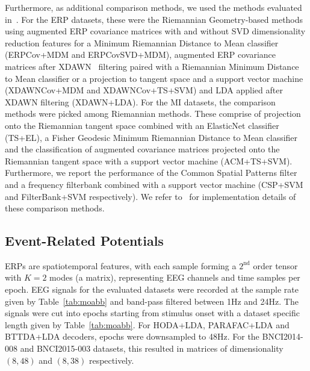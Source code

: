 Furthermore, as additional comparison methods, we used the methods evaluated in~\cite{Chevallier2024}.
For the ERP datasets, these were the Riemannian Geometry-based methods
using augmented ERP covariance matrices with and without SVD dimensionality
reduction features for a Minimum Riemannian Distance to Mean classifier
(ERPCov+MDM and ERPCovSVD+MDM), augmented ERP covariance matrices after
XDAWN~\cite{Rivet2009}
filtering paired with a Riemannian Minimum Distance to Mean classifier or a
projection to tangent space and a support vector machine (XDAWNCov+MDM and
XDAWNCov+TS+SVM) and LDA applied after XDAWN filtering (XDAWN+LDA).
For the MI datasets, the comparison methods were picked among Riemannian
methods.
These comprise of projection onto the Riemannian tangent space combined with an
ElasticNet classifier (TS+EL), a Fisher Geodesic Minimum Riemannian Distance to
Mean classifier and the classification of augmented covariance matrices
projected onto the Riemannian tangent space with a support vector machine
(ACM+TS+SVM).
Furthermore, we report the performance of the Common Spatial Patterns filter
and a frequency filterbank combined with a support vector machine (CSP+SVM and
FilterBank+SVM respectively).
We refer to~\cite{Chevallier2024} for implementation details of these comparison
methods.

\subsection{Event-Related Potentials}
ERPs are spatiotemporal features, with each sample forming a $2^\text{nd}$
order tensor with $K=2$ modes (a matrix), representing EEG channels and time samples
per epoch.
EEG signals for the evaluated datasets were recorded at the sample rate given
by Table~\ref{tab:moabb} and band-pass filtered between 1Hz
and 24Hz.
The signals were cut into epochs starting from stimulus onset with a
dataset specific length given by Table~\ref{tab:moabb}.
For HODA+LDA, PARAFAC+LDA and BTTDA+LDA decoders, epochs were downsampled to 48Hz.
For the BNCI2014-008 and BNCI2015-003 datasets, this resulted in matrices of
dimensionality $(8,48)$ and $(8,38)$ respectively.

